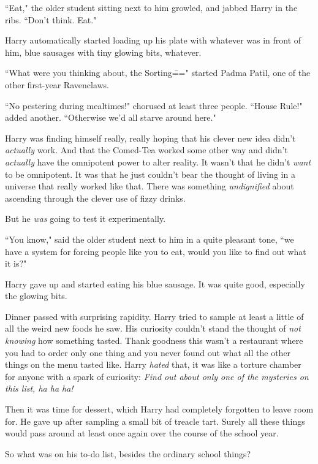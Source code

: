 ``Eat," the older student sitting next to him growled, and jabbed Harry in the ribs. ``Don't think. Eat."

Harry automatically started loading up his plate with whatever was in front of him, blue sausages with tiny glowing bits, whatever.

``What were you thinking about, the Sorting\===" started Padma Patil, one of the other first-year Ravenclaws.

``No pestering during mealtimes!" chorused at least three people. ``House Rule!" added another. ``Otherwise we'd all starve around here."

Harry was finding himself really, really hoping that his clever new idea didn't \emph{actually} work. And that the Comed-Tea worked some other way and didn't \emph{actually} have the omnipotent power to alter reality. It wasn't that he didn't \emph{want} to be omnipotent. It was that he just couldn't bear the thought of living in a universe that really worked like that. There was something \emph{undignified} about ascending through the clever use of fizzy drinks.

But he \emph{was} going to test it experimentally.

``You know," said the older student next to him in a quite pleasant tone, ``we have a system for forcing people like you to eat, would you like to find out what it is?"

Harry gave up and started eating his blue sausage. It was quite good, especially the glowing bits.

Dinner passed with surprising rapidity. Harry tried to sample at least a little of all the weird new foods he saw. His curiosity couldn't stand the thought of \emph{not knowing} how something tasted. Thank goodness this wasn't a restaurant where you had to order only one thing and you never found out what all the other things on the menu tasted like. Harry \emph{hated} that, it was like a torture chamber for anyone with a spark of curiosity: \emph{Find out about only one of the mysteries on this list, ha ha ha!}

Then it was time for dessert, which Harry had completely forgotten to leave room for. He gave up after sampling a small bit of treacle tart. Surely all these things would pass around at least once again over the course of the school year.

So what was on his to-do list, besides the ordinary school things?

